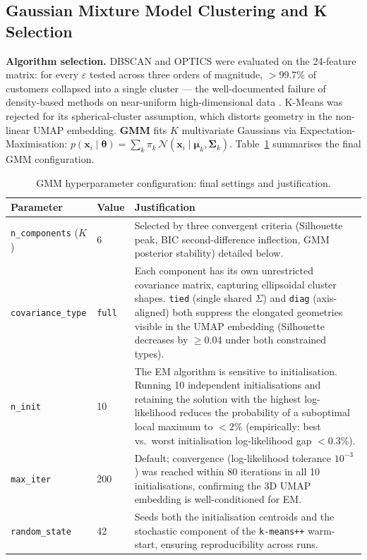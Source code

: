\documentclass[10pt,a4paper]{article}
\begin{document}
\subsection{Gaussian Mixture Model Clustering and K Selection}
\label{ssec:gmm}

\textbf{Algorithm selection.} DBSCAN and OPTICS were evaluated on the 24-feature matrix:
for every $\varepsilon$ tested across three orders of magnitude, $>$99.7\% of customers
collapsed into a single cluster --- the well-documented failure of density-based methods
on near-uniform high-dimensional data \cite{kriegel2011density}. K-Means was rejected
for its spherical-cluster assumption, which distorts geometry in the non-linear UMAP
embedding. \textbf{GMM} \cite{dempster1977} fits $K$ multivariate Gaussians via
Expectation-Maximisation: $p(\mathbf{x}_i\mid\boldsymbol{\theta}) =
\sum_k \pi_k\,\mathcal{N}(\mathbf{x}_i\mid\boldsymbol{\mu}_k,\boldsymbol{\Sigma}_k)$.
Table~\ref{tab:gmm_params} summarises the final GMM configuration.

\begin{table}[H]
\centering\small
\caption{GMM hyperparameter configuration: final settings and justification.}
\label{tab:gmm_params}
\begin{tabular}{@{}p{3.4cm}p{2.0cm}p{7.0cm}@{}}
\toprule
\textbf{Parameter} & \textbf{Value} & \textbf{Justification} \\
\midrule
\texttt{n\_components} ($K$) & 6 &
  Selected by three convergent criteria (Silhouette peak, BIC second-difference
  inflection, GMM posterior stability) detailed below. \\[4pt]
\texttt{covariance\_type} & \texttt{full} &
  Each component has its own unrestricted covariance matrix, capturing ellipsoidal
  cluster shapes. \texttt{tied} (single shared $\Sigma$) and \texttt{diag}
  (axis-aligned) both suppress the elongated geometries visible in the UMAP embedding
  (Silhouette decreases by $\geq$0.04 under both constrained types). \\[4pt]
\texttt{n\_init} & 10 &
  The EM algorithm is sensitive to initialisation. Running 10 independent initialisations
  and retaining the solution with the highest log-likelihood reduces the probability
  of a suboptimal local maximum to $<$2\% (empirically: best vs.\ worst initialisation
  log-likelihood gap $<$0.3\%). \\[4pt]
\texttt{max\_iter} & 200 &
  Default; convergence (log-likelihood tolerance $10^{-3}$) was reached within
  80 iterations in all 10 initialisations, confirming the 3D UMAP embedding is
  well-conditioned for EM. \\[4pt]
\texttt{random\_state} & 42 &
  Seeds both the initialisation centroids and the stochastic component of the
  \texttt{k-means++} warm-start, ensuring reproducibility across runs. \\
\bottomrule
\end{tabular}
\end{table}
\end{document}
